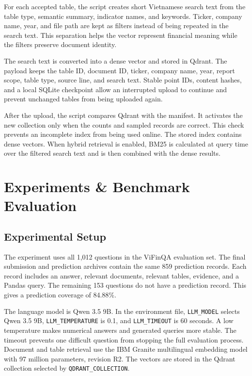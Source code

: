\documentclass[10pt,journal,compsoc]{IEEEtran}
\begin{document}
For each accepted table, the script creates short Vietnamese search text from the table type, semantic summary, indicator names, and keywords. Ticker, company name, year, and file path are kept as filters instead of being repeated in the search text. This separation helps the vector represent financial meaning while the filters preserve document identity.

The search text is converted into a dense vector and stored in Qdrant. The payload keeps the table ID, document ID, ticker, company name, year, report scope, table type, source line, and search text. Stable point IDs, content hashes, and a local SQLite checkpoint allow an interrupted upload to continue and prevent unchanged tables from being uploaded again.

After the upload, the script compares Qdrant with the manifest. It activates the new collection only when the counts and sampled records are correct. This check prevents an incomplete index from being used online. The stored index contains dense vectors. When hybrid retrieval is enabled, BM25 is calculated at query time over the filtered search text and is then combined with the dense results.

\section{Experiments \& Benchmark Evaluation}

\subsection{Experimental Setup}

The experiment uses all 1,012 questions in the ViFinQA evaluation set. The final submission and prediction archives contain the same 859 prediction records. Each record includes an answer, relevant documents, relevant tables, evidence, and a Pandas query. The remaining 153 questions do not have a prediction record. This gives a prediction coverage of 84.88\%.

The language model is Qwen 3.5 9B. In the environment file, \texttt{LLM\_MODEL} selects Qwen 3.5 9B, \texttt{LLM\_TEMPERATURE} is 0.1, and \texttt{LLM\_TIMEOUT} is 60 seconds. A low temperature makes numerical answers and generated queries more stable. The timeout prevents one difficult question from stopping the full evaluation process. Document and table retrieval use the IBM Granite multilingual embedding model with 97 million parameters, revision R2. The vectors are stored in the Qdrant collection selected by \texttt{QDRANT\_COLLECTION}.
\end{document}
